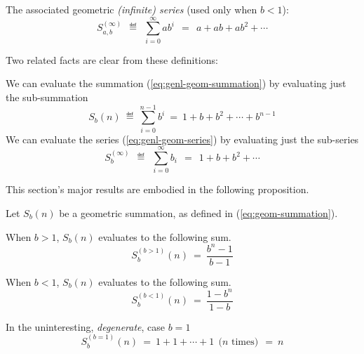 The associated geometric {\em (infinite) series} (used only when $b < 1$):
\begin{equation}
\label{eq:genl-geom-series}
S_{a,b}^{(\infty)} \ \ \eqdef \ \  \sum_{i=0}^\infty a b^i
 \ \  = \ \   a + ab + ab^2 + \cdots 
\end{equation}

\medskip

\noindent
Two related facts are clear from these definitions:

\noindent
We can evaluate the summation (\ref{eq:genl-geom-summation}) by evaluating just the sub-summation
\begin{equation}
\label{eq:geom-summation}
S_{b}(n) \ \eqdef \ \sum_{i=0}^{n-1} b^i \ = \ 1+ b + b^2 + \cdots + b^{n-1}
\end{equation}
We can evaluate the series (\ref{eq:genl-geom-series}) by evaluating just the sub-series
\begin{equation}
\label{eq:geom-series}
S_{b}^{(\infty)} \ \ \eqdef \ \ \sum_{i=0}^\infty b_i \ \ = \ \ 1+ b + b^2 + \cdots 
\end{equation}

\bigskip

This section's major results are embodied in the following proposition.

\begin{prop}
\label{thm:sum-finite-geometric-series}
Let $S_{b}(n)$ be a geometric summation, as defined in
(\ref{eq:geom-summation}).

\smallskip

When $b > 1$, $S_{b}(n)$ evaluates to the following sum.
\begin{equation}
\label{eq:geom-sum:b>1}
S^{(b>1)}_{b}(n) \ = \ \frac{b^{n}- 1}{b - 1}
\end{equation}

\smallskip

When $b < 1$, $S_{b}(n)$ evaluates to the following sum.
\begin{equation}
\label{eq:geom-sum:b<1}
S^{(b<1)}_{b}(n) \ = \ \frac{1 - b^n}{1-b}
\end{equation}

\smallskip

In the uninteresting, {\em degenerate}, case $b=1$
\[ S^{(b=1)}_{b}(n) \ = \ 1 + 1 + \cdots + 1 \ \ \mbox{($n$ times)} \ \ = \ n \]
\end{prop}

